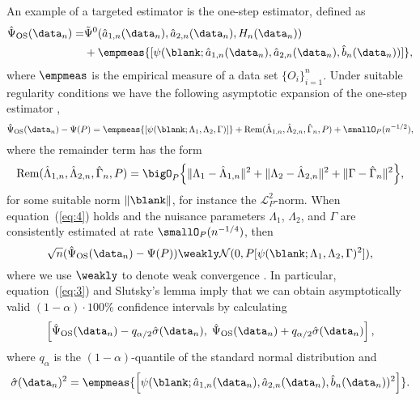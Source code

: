 An example of a targeted estimator is the one-step estimator, defined as
\begin{equation}
    \label{eq:one-step-def}
    \begin{split}
      \hat{\Psi}_{\text{OS}}(\data_n)
      = &
          \tilde{\Psi}^0(\hat{a}_{1,n}(\data_n), \hat{a}_{2,n}(\data_n),
          H_n(\data_n))
      \\
        & + \empmeas{[\psi(\blank; \hat{a}_{1,n}(\data_n), \hat{a}_{2,n}(\data_n),
          \hat{b}_n(\data_n) )]},
    \end{split}
\end{equation}
where \( \empmeas \) is the empirical measure of a data set
\(\{O_i\}_{i=1}^n\).
Under suitable regularity conditions
we have the
following asymptotic expansion of the one-step estimator
\citep{pfanzagl1985contributions,van2003unified,fisher2021visually,kennedy2022semiparametric},
\begin{equation*}
  \hat{\Psi}_{\text{OS}}(\data_n)- \Psi(P)
  =  \empmeas{[\psi(\blank ; \Lambda_1, \Lambda_2, \Gamma)]}
  +\mathrm{Rem}{(\hat{\Lambda}_{1,n},\hat{\Lambda}_{2,n},  \hat{\Gamma}_n, P)} + \smallO_{P}(n^{-1/2}),
\end{equation*}
where the remainder term has the form
\begin{equation}
  \label{eq:4}
  \mathrm{Rem}{(\hat{\Lambda}_{1,n},\hat{\Lambda}_{2,n},  \hat{\Gamma}_n, P)}
  = \bigO_P{
    \left\{
      \|\Lambda_1-\hat{\Lambda}_{1,n}\|^2
      +
      \|\Lambda_2-\hat{\Lambda}_{2,n}\|^2
      +
      \|\Gamma-\hat{\Gamma}_{n}\|^2
    \right\}
  },
\end{equation}
for some suitable norm \( \|\blank \| \), for instance the
\( \mathcal{L}_{P}^2 \)-norm. When equation~(\ref{eq:4}) holds and the
nuisance parameters $\Lambda_1$, $\Lambda_2$, and $\Gamma$ are
consistently estimated at rate \( \smallO_P{(n^{-1/4})} \), then
\begin{equation}
  \label{eq:3}
  \sqrt{n}(\hat{\Psi}_{\text{OS}}(\data_n)- \Psi(P)) \weakly \mathcal{N}(0,
  P{[\psi(\blank; \Lambda_1, \Lambda_2, \Gamma)^2]}),
\end{equation}
where we use \( \weakly \) to denote weak convergence \citep{van2000asymptotic}.
In particular, equation~(\ref{eq:3}) and Slutsky's lemma imply that we can
obtain asymptotically valid \((1-\alpha)\cdot100\%\) confidence intervals by
calculating
\begin{equation*}
  \left[
    \hat{\Psi}_{\text{OS}}(\data_n) - q_{\alpha/2} \hat{\sigma}(\data_n) ,
    \;
    \hat{\Psi}_{\text{OS}}(\data_n) + q_{\alpha/2} \hat{\sigma}(\data_n)
  \right],
\end{equation*}
where \( q_{\alpha} \) is the \( (1-\alpha) \)-quantile of the standard normal
distribution and
\begin{equation*}
  \hat{\sigma}(\data_n)^2 = \empmeas{ \left[ \psi(\blank;
      \hat{a}_{1,n}(\data_n), \hat{a}_{2,n}(\data_n), \hat{b}_n(\data_n))^2
    \right]}.
\end{equation*}



